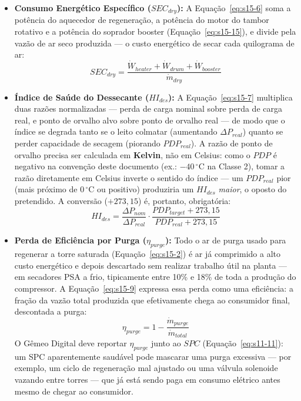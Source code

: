 \documentclass[12pt,a4paper]{article}
\numberwithin{equation}{section}
\numberwithin{table}{section}
\numberwithin{figure}{section}
\begin{document}
		\begin{itemize}
			\item \textbf{Consumo Energético Específico ($SEC_{dry}$):} A Equação~\eqref{eq:s15-6} soma a potência do aquecedor de regeneração, a potência do motor do tambor rotativo e a potência do soprador booster (Equação~\eqref{eq:s15-15}), e divide pela vazão de ar seco produzida — o custo energético de secar cada quilograma de ar:
			\begin{equation}\label{eq:s15-6}
SEC_{dry} = \frac{\dot{W}_{heater} + \dot{W}_{drum} + \dot{W}_{booster}}{\dot{m}_{dry}}
\end{equation}

			\item \textbf{Índice de Saúde do Dessecante ($HI_{des}$):} A Equação~\eqref{eq:s15-7} multiplica duas razões normalizadas — perda de carga nominal sobre perda de carga real, e ponto de orvalho alvo sobre ponto de orvalho real — de modo que o índice se degrada tanto se o leito colmatar (aumentando $\Delta P_{real}$) quanto se perder capacidade de secagem (piorando $PDP_{real}$). A razão de ponto de orvalho precisa ser calculada em \textbf{Kelvin}, não em Celsius: como o $PDP$ é negativo na convenção deste documento (ex.: $-40\,^{\circ}$C na Classe 2), tomar a razão diretamente em Celsius inverte o sentido do índice — um $PDP_{real}$ pior (mais próximo de $0\,^{\circ}$C ou positivo) produziria um $HI_{des}$ \textit{maior}, o oposto do pretendido. A conversão ($+273{,}15$) é, portanto, obrigatória:
			\begin{equation}\label{eq:s15-7}
HI_{des} = \frac{\Delta P_{nom}}{\Delta P_{real}} \cdot \frac{PDP_{target} + 273{,}15}{PDP_{real} + 273{,}15}
\end{equation}

			\item \textbf{Perda de Eficiência por Purga ($\eta_{purge}$):} Todo o ar de purga usado para regenerar a torre saturada (Equação~\eqref{eq:s15-2}) é ar já comprimido a alto custo energético e depois descartado sem realizar trabalho útil na planta — em secadores PSA a frio, tipicamente entre 10\% e 18\% de toda a produção do compressor. A Equação~\eqref{eq:s15-9} expressa essa perda como uma eficiência: a fração da vazão total produzida que efetivamente chega ao consumidor final, descontada a purga:
			\begin{equation}\label{eq:s15-9}
\eta_{purge} = 1 - \frac{\dot{m}_{purge}}{\dot{m}_{total}}
\end{equation}
			O Gêmeo Digital deve reportar $\eta_{purge}$ junto ao $SPC$ (Equação~\eqref{eq:s11-11}): um SPC aparentemente saudável pode mascarar uma purga excessiva — por exemplo, um ciclo de regeneração mal ajustado ou uma válvula solenoide vazando entre torres — que já está sendo paga em consumo elétrico antes mesmo de chegar ao consumidor.
		\end{itemize}
\end{document}
